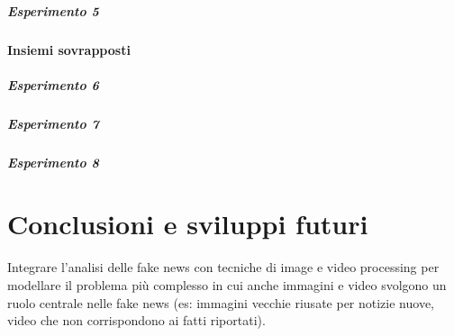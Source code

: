 \documentclass[12pt]{report}
\theoremstyle{definition}
\begin{document}
\paragraph{Esperimento 5}
\subsubsection{Insiemi sovrapposti}
\paragraph{Esperimento 6}
\paragraph{Esperimento 7}
\paragraph{Esperimento 8}

\chapter*{Conclusioni e sviluppi futuri}
\onehalfspacing

Integrare l'analisi delle fake news con tecniche di image e video processing per modellare il problema più complesso in cui anche immagini e video svolgono un ruolo centrale nelle fake news (es: immagini vecchie riusate per notizie nuove, video che non corrispondono ai fatti riportati).

\printbibliography

%
\end{document}
